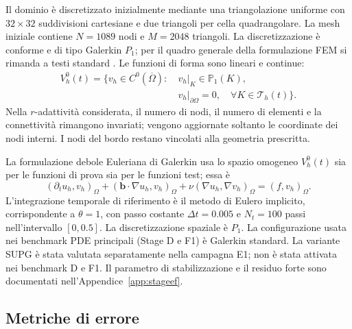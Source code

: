 Il dominio è discretizzato inizialmente mediante una triangolazione uniforme con $32\times32$ suddivisioni cartesiane e due triangoli per cella quadrangolare. La mesh iniziale contiene $N=1089$ nodi e $M=2048$ triangoli. La discretizzazione è conforme e di tipo Galerkin $P_1$; per il quadro generale della formulazione FEM si rimanda a testi standard \citep{quarteroni2009,donea2003finite}. Le funzioni di forma sono lineari e continue:
\begin{equation}
\begin{aligned}
V_h^0(t)=\{v_h\in C^0(\overline{\Omega}):
&\ v_h|_K\in\mathbb P_1(K),\\[-0.2em]
&\ v_h|_{\partial\Omega}=0,\quad
\forall K\in\mathcal T_h(t)\}.
\end{aligned}
\end{equation}
Nella $r$-adattività considerata, il numero di nodi, il numero di elementi e la connettività rimangono invariati; vengono aggiornate soltanto le coordinate dei nodi interni. I nodi del bordo restano vincolati alla geometria prescritta.

La formulazione debole Euleriana di Galerkin usa lo spazio omogeneo $V_h^0(t)$ sia per le funzioni di prova sia per le funzioni test; essa è
\begin{equation}
(\partial_t u_h,v_h)_\Omega
+(\bm b\cdot\nabla u_h,v_h)_\Omega
+\nu(\nabla u_h,\nabla v_h)_\Omega
=(f,v_h)_\Omega.
\label{eq:weak_eulerian}
\end{equation}
L'integrazione temporale di riferimento è il metodo di Eulero implicito, corrispondente a $\theta=1$, con passo costante $\Delta t=0.005$ e $N_t=100$ passi nell'intervallo $[0,0.5]$. La discretizzazione spaziale è $P_1$. La configurazione usata nei benchmark PDE principali (Stage D e F1) è Galerkin standard. La variante SUPG è stata valutata separatamente nella campagna E1; non è stata attivata nei benchmark D e F1. Il parametro di stabilizzazione e il residuo forte sono documentati nell'Appendice~\ref{app:stageef}.

\subsection{Metriche di errore}

